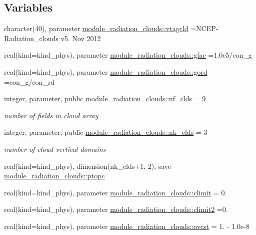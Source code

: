 \subsection*{Variables}
\begin{DoxyCompactItemize}
\item 
character(40), parameter \hyperlink{namespacemodule__radiation__clouds_a54f11c2f6353f244501cf4ec3553d78b}{module\+\_\+radiation\+\_\+clouds\+::vtagcld} =\textquotesingle{}N\+C\+EP-\/Radiation\+\_\+clouds v5. Nov 2012 \textquotesingle{}
\item 
real(kind=kind\+\_\+phys), parameter \hyperlink{namespacemodule__radiation__clouds_ab4060544be25be2b0a87042fb3bd6242}{module\+\_\+radiation\+\_\+clouds\+::gfac} =1.\+0e5/con\+\_\+g
\item 
real(kind=kind\+\_\+phys), parameter \hyperlink{namespacemodule__radiation__clouds_a50ea21222eb91e6363e8bf1338b34a66}{module\+\_\+radiation\+\_\+clouds\+::gord} =con\+\_\+g/con\+\_\+rd
\item 
integer, parameter, public \hyperlink{namespacemodule__radiation__clouds_a66cf0f94619a3d865b0c593197a30576}{module\+\_\+radiation\+\_\+clouds\+::nf\+\_\+clds} = 9
\begin{DoxyCompactList}\small\item\em number of fields in cloud array \end{DoxyCompactList}\item 
integer, parameter, public \hyperlink{namespacemodule__radiation__clouds_a2739168b8205ee860eb8a160ea722a44}{module\+\_\+radiation\+\_\+clouds\+::nk\+\_\+clds} = 3
\begin{DoxyCompactList}\small\item\em number of cloud vertical domains \end{DoxyCompactList}\item 
real(kind=kind\+\_\+phys), dimension(nk\+\_\+clds+1, 2), save \hyperlink{namespacemodule__radiation__clouds_a03bc5d19cbdc84a2032c8d591ba4c96a}{module\+\_\+radiation\+\_\+clouds\+::ptopc}
\item 
real(kind=kind\+\_\+phys), parameter \hyperlink{namespacemodule__radiation__clouds_ad4d5840310847f5bf39082114069ceb8}{module\+\_\+radiation\+\_\+clouds\+::climit} = 0.
\item 
real(kind=kind\+\_\+phys), parameter \hyperlink{namespacemodule__radiation__clouds_a2f6f333d39f496f623036802fc05f209}{module\+\_\+radiation\+\_\+clouds\+::climit2} =0.
\item 
real(kind=kind\+\_\+phys), parameter \hyperlink{namespacemodule__radiation__clouds_a5667082e13ef37593bdfcc152e3dd449}{module\+\_\+radiation\+\_\+clouds\+::ovcst} = 1. -\/ 1.\+0e-\/8

\end{DoxyCompactItemize}

